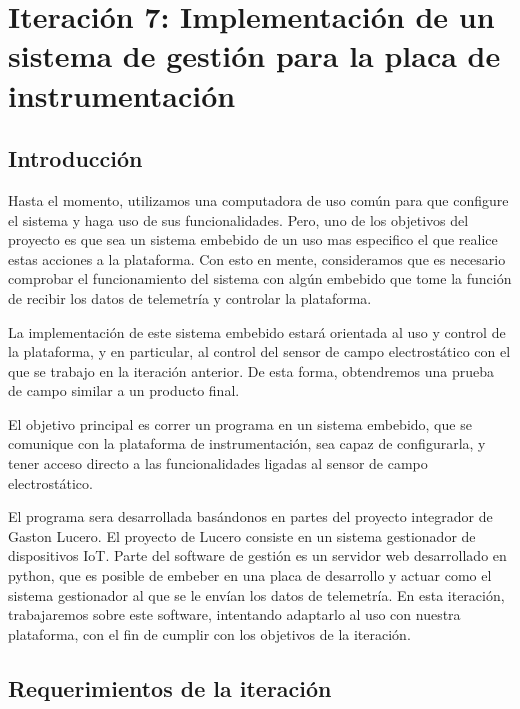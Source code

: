 \chapter{Iteración 7: Implementación de un sistema de gestión para la placa de instrumentación} %
\label{cha:iteracion_7}

\section{Introducción} %
\label{it7:sec:introduccion}

Hasta el momento, utilizamos una computadora de uso común para que configure el sistema y haga uso de sus funcionalidades. Pero, uno de los objetivos del proyecto es que sea un sistema embebido de un uso mas especifico el que realice estas acciones a la plataforma. Con esto en mente, consideramos que es necesario comprobar el funcionamiento del sistema con algún embebido que tome la función de recibir los datos de telemetría y controlar la plataforma.

La implementación de este sistema embebido estará orientada al uso y control de la plataforma, y en particular, al control del sensor de campo electrostático con el que se trabajo en la iteración anterior. De esta forma, obtendremos una prueba de campo similar a un producto final.

El objetivo principal es correr un programa en un sistema embebido, que se comunique con la plataforma de instrumentación, sea capaz de configurarla, y tener acceso directo a las funcionalidades ligadas al sensor de campo electrostático.

El programa sera desarrollada basándonos en partes del proyecto integrador de Gaston Lucero. El proyecto de Lucero consiste en un sistema gestionador de dispositivos IoT. Parte del software de gestión es un servidor web desarrollado en python, que es posible de embeber en una placa de desarrollo y actuar como el sistema gestionador al que se le envían los datos de telemetría. En esta iteración, trabajaremos sobre este software, intentando adaptarlo al uso con nuestra plataforma, con el fin de cumplir con los objetivos de la iteración.


\section{Requerimientos de la iteración} %
\label{it7:sec:requerimientos_de_la_iteracion}

